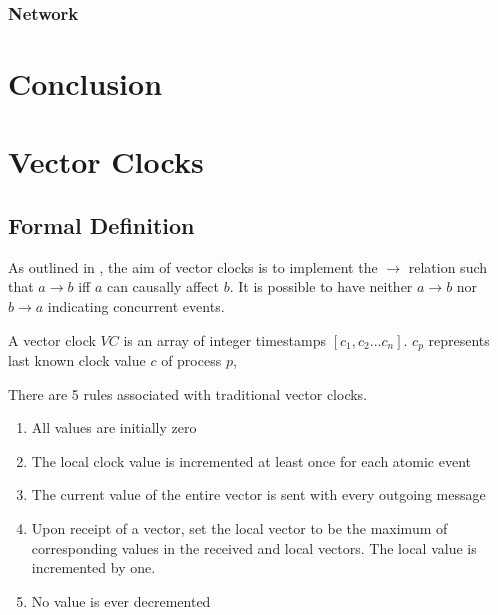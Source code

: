 \documentclass[12pt,a4paper,twoside,openright]{report}
\begin{document}
		\subsection{Network}
		
		
		
		
		
		


\chapter{Conclusion}



\printbibliography

\appendix

\chapter{Vector Clocks}

\section{Formal Definition}
\label{appendix:vectorclocks}

As outlined in \cite{fidge1987}, the aim of vector clocks is to implement the $\rightarrow$ relation such that $ a \rightarrow b$ iff $a$ can causally affect $b$. It is possible to have neither $a \rightarrow b$ nor $b \rightarrow a$ indicating concurrent events.

A vector clock $VC$ is an array of integer timestamps $[c_1, c_2...c_n]$. $c_p$ represents last known clock value $c$ of process $p$, 

There are 5 rules associated with traditional vector clocks.
\begin{enumerate}
	\item All values are initially zero
	\item The local clock value is incremented at least once for each atomic event
	\item The current value of the entire vector is sent with every outgoing message
	\item Upon receipt of a vector, set the local vector to be the maximum of corresponding values in the received and local vectors. The local value is incremented by one.
	\item No value is ever decremented	
\end{enumerate}
\end{document}
